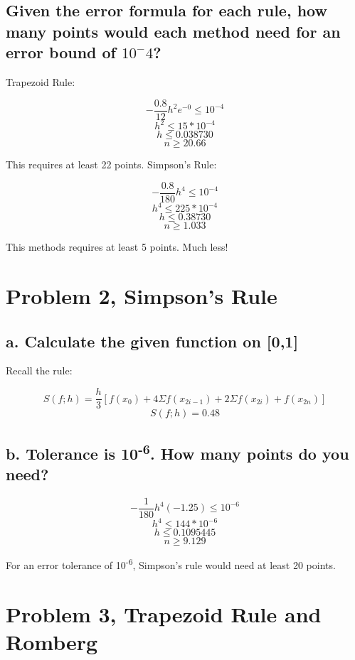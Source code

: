 \documentclass[]{article}
\begin{document}
\subsection{\texorpdfstring{Given the error formula for each rule, how
many points would each method need for an error bound of
\(10^-4\)?}{Given the error formula for each rule, how many points would each method need for an error bound of 10\^{}-4?}}\label{given-the-error-formula-for-each-rule-how-many-points-would-each-method-need-for-an-error-bound-of-10-4}

Trapezoid Rule:

\[-\frac{0.8}{12}h^2e^{-0} \leq 10^{-4}\] \[h^2 \leq 15*10^{-4}\]
\[h \leq 0.038730\] \[n \geq 20.66 \]

This requires at least 22 points. Simpson's Rule:

\[-\frac{0.8}{180}h^4\leq 10^{-4}\] \[h^4 \leq 225 * 10^{-4}\]
\[h \leq 0.38730\] \[n \geq 1.033\]

This methods requires at least 5 points. Much less!

\section{Problem 2, Simpson's Rule}\label{problem-2-simpsons-rule}

\subsection{a. Calculate the given function on
{[}0,1{]}}\label{a.-calculate-the-given-function-on-01}

Recall the rule:

\[S(f;h) = \frac{h}3[f(x_0) + 4\Sigma f(x_{2i-1}) + 2\Sigma f(x_{2i}) + f(x_{2n})]\]
\[S(f;h) = 0.48\]

\subsection{\texorpdfstring{b. Tolerance is 10\textsuperscript{-6}. How
many points do you
need?}{b. Tolerance is 10-6. How many points do you need?}}\label{b.-tolerance-is-10-6.-how-many-points-do-you-need}

\[-\frac{1}{180}h^4(-1.25)\leq 10^{-6}\] \[h^4 \leq 144 * 10^{-6}\]
\[h \leq 0.1095445\] \[n \geq 9.129\]

For an error tolerance of 10\textsuperscript{-6}, Simpson's rule would
need at least 20 points.

\section{Problem 3, Trapezoid Rule and
Romberg}\label{problem-3-trapezoid-rule-and-romberg}
\end{document}
